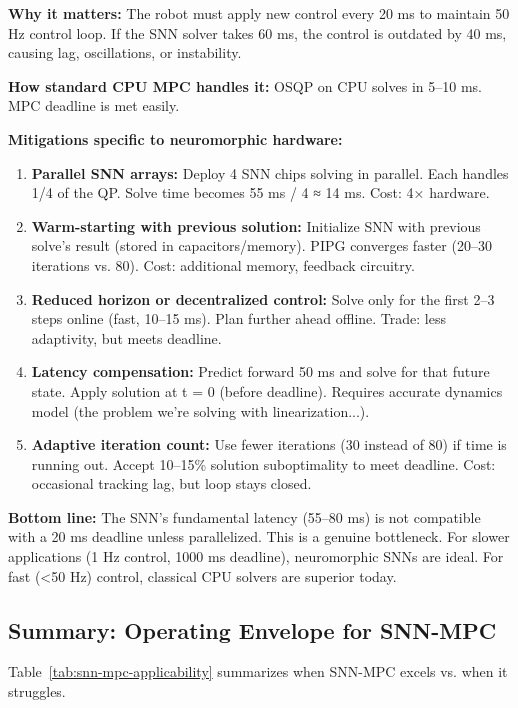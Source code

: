 \textbf{Why it matters:} The robot must apply new control every 20 ms to maintain 50 Hz control loop. If the SNN solver takes 60 ms, the control is outdated by 40 ms, causing lag, oscillations, or instability.

\textbf{How standard CPU MPC handles it:} OSQP on CPU solves in 5--10 ms. MPC deadline is met easily.

\textbf{Mitigations specific to neuromorphic hardware:}
\begin{enumerate}
\item \textbf{Parallel SNN arrays:} Deploy 4 SNN chips solving in parallel. Each handles 1/4 of the QP. Solve time becomes 55 ms / 4 ≈ 14 ms. Cost: 4× hardware.

\item \textbf{Warm-starting with previous solution:} Initialize SNN with previous solve's result (stored in capacitors/memory). PIPG converges faster (20--30 iterations vs. 80). Cost: additional memory, feedback circuitry.

\item \textbf{Reduced horizon or decentralized control:} Solve only for the first 2--3 steps online (fast, 10--15 ms). Plan further ahead offline. Trade: less adaptivity, but meets deadline.

\item \textbf{Latency compensation:} Predict forward 50 ms and solve for that future state. Apply solution at t = 0 (before deadline). Requires accurate dynamics model (the problem we're solving with linearization...).

\item \textbf{Adaptive iteration count:} Use fewer iterations (30 instead of 80) if time is running out. Accept 10--15\% solution suboptimality to meet deadline. Cost: occasional tracking lag, but loop stays closed.
\end{enumerate}

\textbf{Bottom line:} The SNN's fundamental latency (55--80 ms) is not compatible with a 20 ms deadline unless parallelized. This is a genuine bottleneck. For slower applications (1 Hz control, 1000 ms deadline), neuromorphic SNNs are ideal. For fast (<50 Hz) control, classical CPU solvers are superior today.

\subsection{Summary: Operating Envelope for SNN-MPC}

Table~\ref{tab:snn-mpc-applicability} summarizes when SNN-MPC excels vs. when it struggles.

